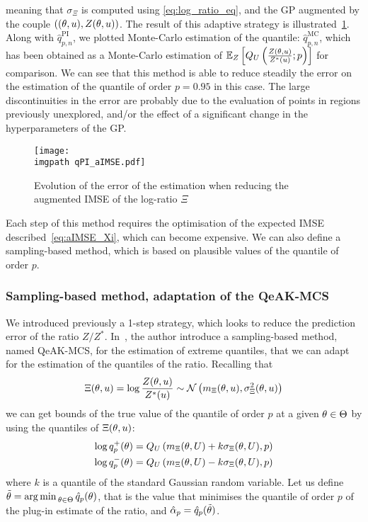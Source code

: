 \documentclass[../../Main_ManuscritThese.tex]{subfiles}
\newcommand\imgpath{/home/victor/acadwriting/Manuscrit/Text/Chapter4/img/}
\begin{document}
meaning that $\sigma_{\Xi}$ is computed using \cref{eq:log_ratio_eq},
and the GP augmented by the couple
$\left((\theta, u), Z(\theta, u)\right)$.  The result of this adaptive
strategy is illustrated~\cref{fig:qPI_aIMSE}. Along with
$\hat{q}_{p,n}^{\mathrm{PI}}$, we plotted Monte-Carlo estimation of
the quantile: $\hat{q}_{p,n}^{\mathrm{MC}}$, which has been obtained
as a Monte-Carlo estimation of
$\mathbb{E}_{Z}\left[Q_{U}\left(\frac{Z(\theta,
      u)}{Z^*(u)};p\right)\right]$ for comparison.  We can see
that this method is able to reduce steadily the error on the
estimation of the quantile of order $p=0.95$ in this case. The large
discontinuities in the error are probably due to the evaluation of points
in regions previously unexplored, and/or the effect of a significant
change in the hyperparameters of the GP.
\begin{figure}[ht]
  \centering
  \texttt{[image: \\imgpath qPI\_aIMSE.pdf]}
  \caption[Error of the estimation when reducing the augmented ISME of $\Xi$]{\label{fig:qPI_aIMSE} Evolution of the error of the estimation when reducing the augmented IMSE of the log-ratio $\Xi$}
\end{figure}

Each step of this method requires the optimisation of the expected
IMSE described~\cref{eq:aIMSE_Xi}, which can become expensive. We can also
define a sampling-based method, which is based on plausible values of
the quantile of order $p$.

\subsubsection{Sampling-based method, adaptation of the QeAK-MCS}
\label{ssec:quantile_qeakmcs}
We introduced previously a 1-step strategy, which looks to reduce the
prediction error of the ratio
$Z/Z^*$. In~\cite{razaaly_rare_2019,razaaly_quantile-based_2020}, the
author introduce a sampling-based method, named QeAK-MCS, for the estimation of extreme
quantiles, that we can adapt for the estimation of the quantiles of
the ratio.  Recalling that
\begin{equation}
  \Xi(\theta, u) = \log\frac{Z(\theta, u)}{Z^*(u)} \sim \mathcal{N}\left(m_{\Xi}(\theta, u),\sigma^2_{\Xi}(\theta, u)\right)
\end{equation}
we can get bounds of the true value of the quantile of order $p$ at a
given $\theta\in\Theta$ by using the quantiles of $\Xi(\theta, u)$:
\begin{align}
  \log q_p^{+}(\theta) = Q_{U}\left(m_{\Xi}(\theta, U) + k \sigma_{\Xi}(\theta, U), p\right) \\
  \log q_p^{-}(\theta) = Q_{U}\left(m_{\Xi}(\theta, U) - k \sigma_{\Xi}(\theta, U), p\right)
\end{align}
where $k$ is a quantile of the standard Gaussian random variable.  Let us define
$\tilde{\theta}=\operatorname*{arg\,min \,}_{\theta \in\Theta} \hat{q}_p(\theta)$, that is the
value that minimises the quantile of order $p$ of the plug-in estimate
of the ratio, and $\hat{\alpha}_p = \hat{q}_p(\tilde{\theta})$.
\end{document}
